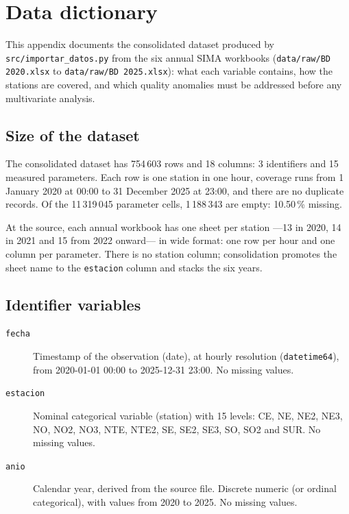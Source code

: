 \section{Data dictionary}\label{sec:diccionario}

This appendix documents the consolidated dataset produced by
\texttt{src/importar\_datos.py} from the six annual SIMA workbooks
(\texttt{data/raw/BD 2020.xlsx} to \texttt{data/raw/BD 2025.xlsx}): what each
variable contains, how the stations are covered, and which quality anomalies
must be addressed before any multivariate analysis.

\subsection{Size of the dataset}\label{sec:dic:dimension}

The consolidated dataset has 754\,603 rows and 18 columns: 3 identifiers and
15 measured parameters. Each row is one station in one hour, coverage runs
from 1 January 2020 at 00:00 to 31 December 2025 at 23:00, and there are no
duplicate records. Of the 11\,319\,045 parameter cells, 1\,188\,343 are
empty: 10.50\,\% missing.

At the source, each annual workbook has one sheet per station ---13 in 2020,
14 in 2021 and 15 from 2022 onward--- in wide format: one row per hour and one
column per parameter. There is no station column; consolidation promotes the
sheet name to the \texttt{estacion} column and stacks the six years.

\subsection{Identifier variables}\label{sec:dic:identificadoras}

\begin{description}
  \item[\texttt{fecha}] Timestamp of the observation (date), at hourly
    resolution (\texttt{datetime64}), from 2020-01-01 00:00 to 2025-12-31
    23:00. No missing values.
  \item[\texttt{estacion}] Nominal categorical variable (station) with 15
    levels: CE, NE, NE2, NE3, NO, NO2, NO3, NTE, NTE2, SE, SE2, SE3, SO, SO2
    and SUR. No missing values.
  \item[\texttt{anio}] Calendar year, derived from the source file. Discrete
    numeric (or ordinal categorical), with values from 2020 to 2025. No
    missing values.
\end{description}

